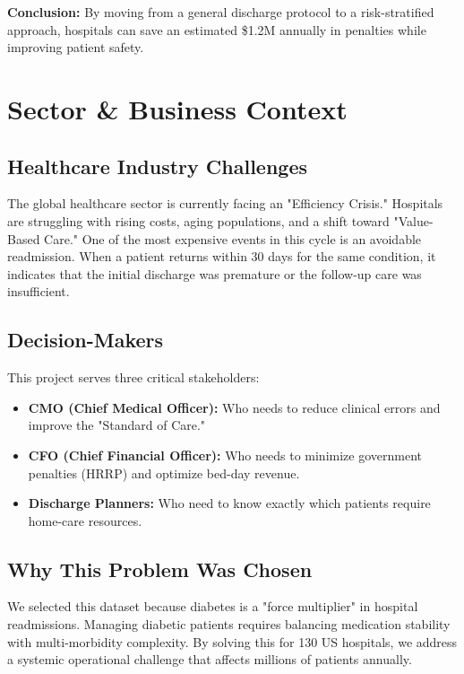 \documentclass[12pt,a4paper]{article}
\begin{document}
\textbf{Conclusion:} By moving from a general discharge protocol to a risk-stratified approach, hospitals can save an estimated \$1.2M annually in penalties while improving patient safety.

\newpage

\section{Sector \& Business Context}
\subsection{Healthcare Industry Challenges}
The global healthcare sector is currently facing an "Efficiency Crisis." Hospitals are struggling with rising costs, aging populations, and a shift toward "Value-Based Care." One of the most expensive events in this cycle is an avoidable readmission. When a patient returns within 30 days for the same condition, it indicates that the initial discharge was premature or the follow-up care was insufficient.

\subsection{Decision-Makers}
This project serves three critical stakeholders:
\begin{itemize}
    \item \textbf{CMO (Chief Medical Officer):} Who needs to reduce clinical errors and improve the "Standard of Care."
    \item \textbf{CFO (Chief Financial Officer):} Who needs to minimize government penalties (HRRP) and optimize bed-day revenue.
    \item \textbf{Discharge Planners:} Who need to know exactly which patients require home-care resources.
\end{itemize}

\subsection{Why This Problem Was Chosen}
We selected this dataset because diabetes is a "force multiplier" in hospital readmissions. Managing diabetic patients requires balancing medication stability with multi-morbidity complexity. By solving this for 130 US hospitals, we address a systemic operational challenge that affects millions of patients annually.
\end{document}
